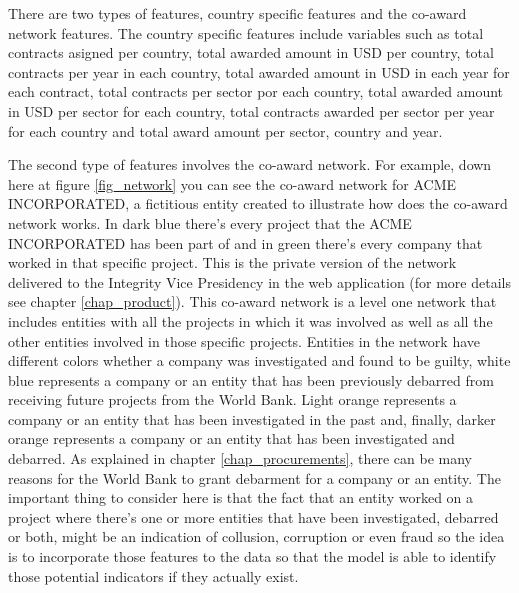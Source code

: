 There are two types of features, country specific features and the co-award network features. The country specific features include variables such as total contracts  asigned per country,  total awarded amount in USD per country, total contracts per year in each country, total awarded amount in USD in each year for each contract, total contracts per sector por each country, total awarded amount in USD per sector for each country, total contracts awarded per sector per year for each country and total award amount per sector, country and year.

The second type of features involves the co-award network.  For example, down here at figure \ref{fig_network} you can see the co-award network for ACME INCORPORATED, a fictitious entity created to illustrate how does the co-award network works.  In dark blue there's every project that  the ACME INCORPORATED has been part of and in green there's every company that worked in that specific project. This is the private version of the network delivered to the Integrity Vice Presidency in the web application (for more details see chapter \ref{chap_product}). This co-award network is a level one network that includes entities with all the projects in which it was involved as well as all the other entities involved in those specific projects. Entities in the network have different colors whether a company was investigated and found to be guilty, white blue represents a company or an entity that has been previously debarred from receiving future projects from the World Bank. Light orange represents a company or an entity that has been investigated in the past and, finally, darker orange represents a company or an entity that has been investigated and debarred. As explained in chapter \ref{chap_procurements}, there can be many reasons for the World Bank to grant debarment for a company or an entity. The important thing to consider here is that the fact that an entity worked on a project where there's one or more entities that have been investigated, debarred or both, might be an indication of collusion, corruption or even fraud so the idea is to incorporate  those features to the data so that the model is able to identify those potential indicators if they actually exist.


